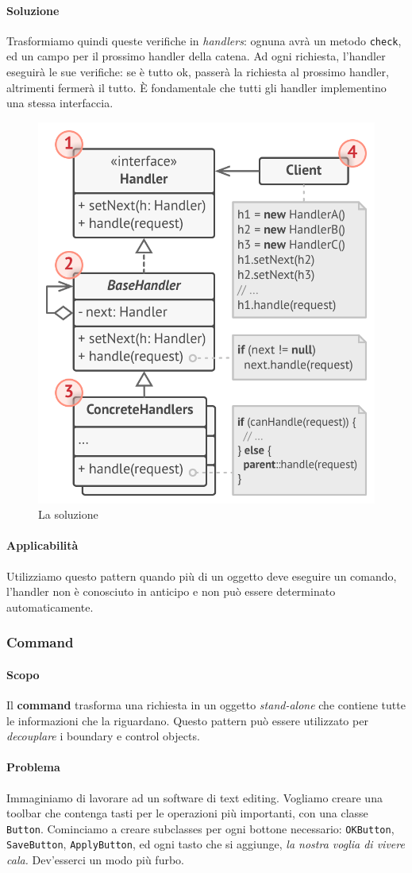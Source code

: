 \documentclass[11pt]{article}
\newcommand{\code}[1]{\texttt{#1}}
\begin{document}
\paragraph{Soluzione}
Trasformiamo quindi queste verifiche in \textit{handlers}: ognuna avrà un metodo \code{check}, ed un campo per il prossimo handler della catena. Ad ogni richiesta, l'handler eseguirà le sue verifiche: se è tutto ok, passerà la richiesta al prossimo handler, altrimenti fermerà il tutto. È fondamentale che tutti gli handler implementino una stessa interfaccia. 
\begin{figure}[H]
    \centering
    \includegraphics[width=0.6\linewidth]{res/teoria/Handler.png}
    \caption{La soluzione}
\end{figure}
\paragraph{Applicabilità}
Utilizziamo questo pattern quando più di un oggetto deve eseguire un comando, l'handler non è conosciuto in anticipo e non può essere determinato automaticamente.
\subsubsection{Command}
\paragraph{Scopo}
Il \textbf{command} trasforma una richiesta in un oggetto \textit{stand-alone} che contiene tutte le informazioni che la riguardano. Questo pattern può essere utilizzato per \textit{decouplare} i boundary e control objects.
\paragraph{Problema}
Immaginiamo di lavorare ad un software di text editing. Vogliamo creare una toolbar che contenga tasti per le operazioni più importanti, con una classe \code{Button}. Cominciamo a creare subclasses per ogni bottone necessario: \code{OKButton}, \code{SaveButton}, \code{ApplyButton}, ed ogni tasto che si aggiunge, \textit{la nostra voglia di vivere cala.} Dev'esserci un modo più furbo.
\end{document}
